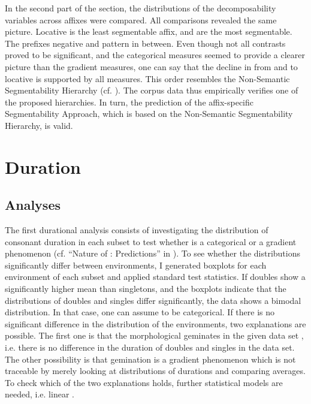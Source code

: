  In the second part of the section, the distributions of the decomposability variables across affixes were compared. All comparisons revealed the same picture. Locative  is the least segmentable affix,  and  are the most segmentable. The prefixes negative  and  pattern in between. 
 Even though not all contrasts proved to be significant, and the categorical measures seemed to provide a clearer picture than the gradient measures, one can say that the decline in  from  and  to locative  is supported by all measures. 
 This order resembles the Non-Semantic Segmentability Hierarchy (cf.  ). The corpus data thus empirically verifies one of the proposed  hierarchies. In turn, the  prediction of the affix-specific Segmentability Approach, which is based on the Non-Semantic Segmentability Hierarchy, is valid. 

\section{Duration}
\subsection{Analyses} \label{analyses dur corpus}\largerpage


The first durational analysis consists of investigating the distribution of consonant duration in each subset to test whether  is a categorical or a gradient phenomenon (cf. ``Nature of : Predictions'' in ). To see whether the distributions significantly differ between environments, I generated boxplots for each environment of each subset and applied standard test statistics. 
If doubles show a significantly higher mean than singletons, and the boxplots indicate that the distributions of doubles and singles differ significantly, the data shows a bimodal distribution. In that case, one can assume  to be categorical. 
If there is no significant difference in the distribution of the environments, two explanations are possible. The first one is that the morphological geminates in the given data set , i.e. there is no difference in the duration of doubles and singles in the data set. The other possibility is that {gemination} is a gradient phenomenon which is not traceable by merely looking at distributions of durations and comparing averages. To check which of the two explanations holds, further statistical models are needed, i.e. linear . 



